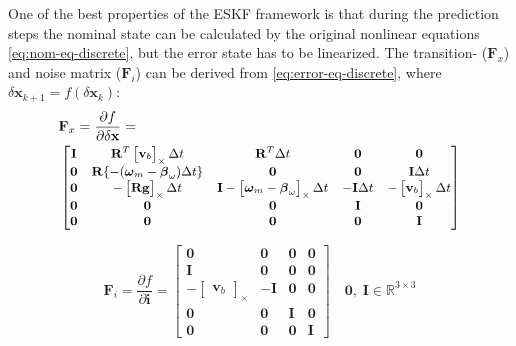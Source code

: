 One of the best properties of the ESKF framework is that during the prediction steps the nominal state can be calculated by the original nonlinear equations \eqref{eq:nom-eq-discrete}, but the error state has to be linearized. The transition- ($\mathbf{F}_x$) and noise matrix ($\mathbf{F}_i$) can be derived from \eqref{eq:error-eq-discrete}, where $\delta\mathbf{x}_{k+1}=f(\delta\mathbf{x}_k)$:
\begin{equation}
\begin{aligned}
     &\mathbf{F}_x=\frac{\partial f}{\partial\delta\mathbf{x}}= \\  
     & \small \begin{bmatrix}
        \mathbf{I} & \mathbf{R}^T\begin{bmatrix}\mathbf{v}_{b}\end{bmatrix}_\times\Delta t & \mathbf{R}^T\Delta t & \mathbf{0} & \mathbf{0} \\
        \mathbf{0} & \mathbf{R}\{-(\boldsymbol{\omega}_{m}-\boldsymbol{\beta}_{\omega})\Delta t\} & \mathbf{0} & \mathbf{0} & \mathbf{I}\Delta t \\
        \mathbf{0} & -\begin{bmatrix}\mathbf{R}\mathbf{g}\end{bmatrix}_\times\Delta t & \mathbf{I}-\begin{bmatrix} \boldsymbol{\omega}_{m}-\boldsymbol{\beta}_{\omega}\end{bmatrix}_\times\Delta t & -\mathbf{I}\Delta t & -\begin{bmatrix} \mathbf{v}_{b}\end{bmatrix}_\times\Delta t \\
        \mathbf{0} & \mathbf{0} & \mathbf{0} & \mathbf{I} & \mathbf{0} \\
        \mathbf{0} & \mathbf{0} & \mathbf{0} & \mathbf{0} & \mathbf{I}
    \end{bmatrix}
\end{aligned}
\end{equation}

\begin{equation}
    \mathbf{F}_i=\frac{\partial f}{\partial \mathbf{i}}=\begin{bmatrix}
         \mathbf{0} & \mathbf{0} & \mathbf{0} & \mathbf{0} \\
         \mathbf{I} & \mathbf{0} & \mathbf{0} & \mathbf{0} \\
         -\begin{bmatrix}
             \mathbf{v}_{b}
         \end{bmatrix}_\times & -\mathbf{I} & \mathbf{0} & \mathbf{0} \\
         \mathbf{0} & \mathbf{0} & \mathbf{I} & \mathbf{0} \\
         \mathbf{0} & \mathbf{0} & \mathbf{0} & \mathbf{I}
    \end{bmatrix} \quad \mathbf{0},\; \mathbf{I}\in\mathbb{R}^{3\times 3}
\end{equation}

